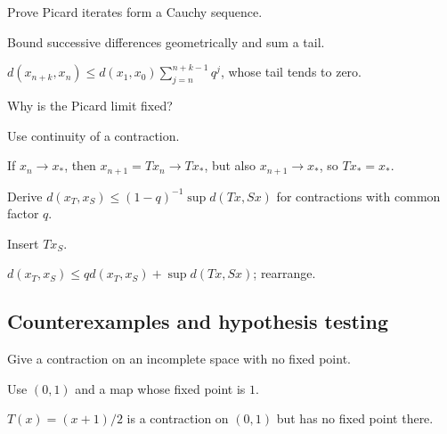 \begin{exercise}\label{exr:ii16-expand-07}
Prove Picard iterates form a Cauchy sequence.
\end{exercise}
\begin{hint}
Bound successive differences geometrically and sum a tail.
\end{hint}
\begin{solution}
\(d(x_{n+k},x_n)\le d(x_1,x_0)\sum_{j=n}^{n+k-1}q^j\), whose tail tends to zero.
\end{solution}

\begin{exercise}\label{exr:ii16-expand-08}
Why is the Picard limit fixed?
\end{exercise}
\begin{hint}
Use continuity of a contraction.
\end{hint}
\begin{solution}
If \(x_n\to x_*\), then \(x_{n+1}=Tx_n\to Tx_*\), but also \(x_{n+1}\to x_*\), so \(Tx_*=x_*\).
\end{solution}

\begin{exercise}\label{exr:ii16-expand-09}
Derive \(d(x_T,x_S)\le(1-q)^{-1}\sup d(Tx,Sx)\) for contractions with common factor \(q\).
\end{exercise}
\begin{hint}
Insert \(Tx_S\).
\end{hint}
\begin{solution}
\(d(x_T,x_S)\le qd(x_T,x_S)+\sup d(Tx,Sx)\); rearrange.
\end{solution}

\subsection*{Counterexamples and hypothesis testing}

\begin{exercise}\label{exr:ii16-expand-10}
Give a contraction on an incomplete space with no fixed point.
\end{exercise}
\begin{hint}
Use \((0,1)\) and a map whose fixed point is \(1\).
\end{hint}
\begin{solution}
\(T(x)=(x+1)/2\) is a contraction on \((0,1)\) but has no fixed point there.
\end{solution}

